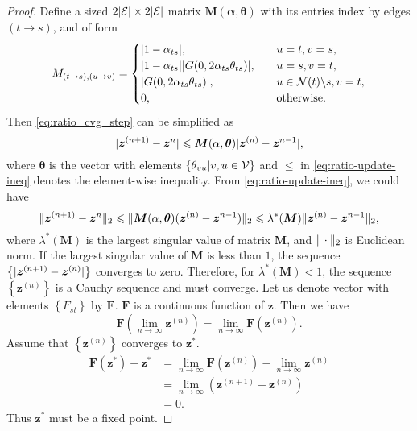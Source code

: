 \documentclass[conference,onecolumn]{IEEEtran}
\begin{document}
\begin{proof}
  Define a sized $2| \mathcal{E} | \times 2| \mathcal{E} |$ matrix $\bm{M}(\bm{\alpha}, \bm{\theta})$ with its entries index by edges $(t\rightarrow s)$, and of form
  \begin{equation}
    M_{(t\rightarrow s), (u \rightarrow v)} =
    \begin{cases}
      |  1 - \alpha_{ts} |, &\quad u=t, v=s, \\
      |  1 - \alpha_{ts} | | G(0, 2 \alpha_{ts} \theta_{ts}) |, & \quad u = s, v =t, \\
      | G(0, 2 \alpha_{ts} \theta_{ts}) |, & \quad u \in \mathcal{N}(t)\backslash s, v = t, \\
      0, & \quad \mathrm{otherwise}.
    \end{cases}
  \end{equation}
  Then \eqref{eq:ratio_cvg_step} can be simplified as
  \begin{equation}\label{eq:ratio-update-ineq}
    | \bm{z}^{(n+1)} - \bm{z}^{n} | \leqslant \bm{M}(\alpha, \bm{\theta})| \bm{z}^{(n)} - \bm{z}^{n-1} |,
  \end{equation}
  where $\bm{\theta}$ is the vector with elements $\left\{ \theta_{vu}| v, u \in \mathcal{V} \right\}$ and $\leq$ in \eqref{eq:ratio-update-ineq} denotes the element-wise inequality. From \eqref{eq:ratio-update-ineq}, we could have
  \begin{equation}
    \| \bm{z}^{(n+1)} - \bm{z}^{n} \|_{2} \leqslant \| \bm{M}(\alpha, \bm{\theta})(\bm{z}^{(n)} - \bm{z}^{n-1}) \|_{2} \leqslant \lambda^{\ast}(\bm{M})\| \bm{z}^{(n)} - \bm{z}^{n-1} \|_{2},
  \end{equation}
  where $\lambda^{\ast}(\bm{M})$ is the largest singular value of matrix
  $\bm{M}$, and $\| \cdot \|_{2}$ is Euclidean norm. If the largest singular value of $\bm{M}$ is less than $1$, the sequence
  $\left\{| \bm{z}^{(n+1)} - \bm{z}^{(n)} |\right\}$ converges to zero. Therefore, for $\lambda^{\ast}(\bm{M})<1$, the sequence $\left\{ \bm{z}^{(n)} \right\}$ is a Cauchy sequence and must converge. Let us denote vector with elements $\left\{ F_{st} \right\}$ by $\bm{F}$. $\bm{F}$ is a continuous function of $\bm{z}$. Then we have
  \begin{equation}
    \bm{F}(\lim_{n\rightarrow \infty}\bm{z}^{(n)}) = \lim_{n\rightarrow \infty}\bm{F}(\bm{z}^{(n)}).
  \end{equation}
  Assume that $\left\{ \bm{z}^{(n)} \right\}$ converges to
  $\bm{z}^{\ast}$.
  \begin{align}
    \bm{F}(\bm{z}^{\ast}) - \bm{z}^{\ast}
    &= \lim_{n\rightarrow \infty} \bm{F}(\bm{z}^{(n)}) -\lim_{n\rightarrow
      \infty} \bm{z}^{(n)} \nonumber \\
    &= \lim_{n\rightarrow \infty} (\bm{z}^{(n+1)} - \bm{z}^{(n)}) \nonumber \\
    &= 0.
  \end{align}
  Thus $\bm{z}^{\ast}$ must be a fixed point.


\end{proof}
\end{document}
